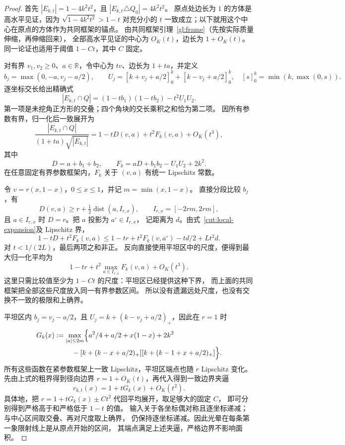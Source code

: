 \begin{proof}
首先 $|E_{k,t}|=1-4k^2t^2$，且 $|E_{k,t}\triangle Q_0|=4k^2t^2$。
原点处边长为 $1$ 的方体是高水平见证，因为
$\sqrt{1-4k^2t^2}>1-t$ 对充分小的 $t$ 一致成立；以下就用这个中心在原点的方体作为共同框架的锚点。
由共同框架引理~\ref{gl:frame}（先按实际质量伸缩，再伸缩回来），
全部高水平见证的中心为 $O_K(t)$，边长为 $1+O_K(t)$。
同一论证也适用于阈值 $1-Ct$，其中 $C$ 固定。

对有界 $v_1,v_2\ge0$、$a\in\mathbb R$，令中心为 $tv$、边长为 $1+ta$，并定义
\[
 b_j=\max(0,-a,v_j-a/2),\qquad
 U_j=[k+v_j+a/2]_0^k+[k-v_j+a/2]_0^k,
 \quad [s]_0^k=\min(k,\max(0,s)).
\]
逐坐标交长给出精确式
\[
 |E_{k,t}\cap Q|=(1-tb_1)(1-tb_2)-t^2U_1U_2.
\]
第一项是未挖角正方形的交叠；四个角块的交长乘积之和恰为第二项。
因所有参数有界，归一化后一致展开为
\begin{equation}\label{cut:local-expansion}
 \frac{|E_{k,t}\cap Q|}{(1+ta)\sqrt{|E_{k,t}|}}
 =1-tD(v,a)+t^2F_k(v,a)+O_K(t^3),
\end{equation}
其中
\[
 D=a+b_1+b_2,\qquad F_k=aD+b_1b_2-U_1U_2+2k^2.
\]
在任意固定有界参数框架内，$F_k$ 关于 $(v,a)$ 有统一 Lipschitz 常数。

令 $v=r(x,1-x)$，$0\le x\le1$，并记 $m=\min(x,1-x)$。
直接分段比较 $b_j$，有
\begin{equation}\label{cut:projection-gap}
 D(v,a)\ge r+\tfrac12\operatorname{dist}(a,I_{r,x}),
 \qquad I_{r,x}=[-2rm,2rm],
\end{equation}
且 $a\in I_{r,x}$ 时 $D=r$。把 $a$ 投影为 $a^\circ\in I_{r,x}$，
记距离为 $d$。由式~\eqref{cut:local-expansion}及 Lipschitz 界，
\[
 1-tD+t^2F_k(v,a)
 \le1-tr+t^2F_k(v,a^\circ)-td/2+Lt^2d.
\]
对 $t<1/(2L)$，最后两项之和非正。
反向直接使用平坦区中的尺度，便得到最大归一化平均为
\[
 1-tr+t^2\max_{a\in I_{r,x}}F_k(v,a)+O_K(t^3).
\]
这里只需比较值至少为 $1-Ct$ 的尺度：平坦区已经提供这种下界，
而上面的共同框架把全部这些尺度放入同一有界参数区间。
所以没有遗漏远处尺度，也没有交换不一致的极限和上确界。

平坦区内 $b_j=v_j-a/2$，且
$U_j=k+(k-v_j+a/2)_+$，因此在 $r=1$ 时
\begin{align*}
 G_k(x)&:=\max_{|a|\le2m}\Bigl\{
 a^2/4+a/2+x(1-x)+2k^2\\
 &\hspace{2.5em}{}-[k+(k-x+a/2)_+][k+(k-1+x+a/2)_+]\Bigr\}.
\end{align*}
所有这些函数在紧参数框架上一致 Lipschitz，平坦区端点也随 $r$ Lipschitz 变化。
先由上式的粗界得到径向边界 $r=1+O_K(t)$，再代入得到一致边界夹逼
\begin{equation}\label{cut:radial}
 r_{k,t}(x)=1+tG_k(x)+O_K(t^2).
\end{equation}
具体地，把 $r=1+tG_k(x)\pm Ct^2$ 代回平均展开，取足够大的固定 $C$，
即可分别得到严格高于和严格低于 $1-t$ 的值。
输入关于各坐标偶对称且逐坐标递减；与中心区间取交叠、再对尺度取上确界，
仍保持逐坐标递减。因此光晕在每条第一象限射线上是从原点开始的区间，
其端点满足上述夹逼，严格边界不影响面积。


\end{proof}
